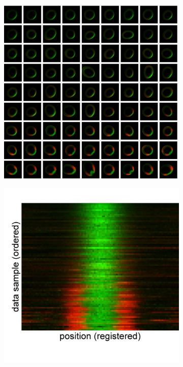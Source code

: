 \documentclass{pnastwo}
\begin{document}
\begin{figure}
\begin{minipage}{0.6\textwidth}
\begin{subfigure}{\textwidth}
\includegraphics[width=\textwidth]{registered_ordered_vdm_2d}
\caption{}
\label{subfig:images_vdm}
\end{subfigure}
\end{minipage}
\begin{minipage}{0.3\textwidth}
\begin{subfigure}{\textwidth}
\includegraphics[width=\textwidth]{registered_ordered_vdm_1d}

\end{subfigure}
\end{minipage}
\end{figure}
\end{document}
